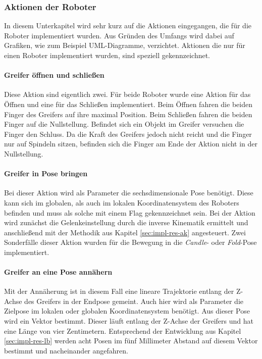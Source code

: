 \subsubsection{Aktionen der Roboter}

In diesem Unterkapitel wird sehr kurz auf die Aktionen eingegangen, die für die Roboter implementiert wurden. Aus Gründen des Umfangs wird dabei auf Grafiken, wie zum Beispiel UML-Diagramme, verzichtet. Aktionen die nur für einen Roboter implementiert wurden, sind speziell gekennzeichnet.

\paragraph{Greifer öffnen und schließen} Diese Aktion sind eigentlich zwei. Für beide Roboter wurde eine Aktion für das Öffnen und eine für das Schließen implementiert. Beim Öffnen fahren die beiden Finger des Greifers auf ihre maximal Position. Beim Schließen fahren die beiden Finger auf die Nullstellung. Befindet sich ein Objekt im Greifer versuchen die Finger den Schluss. Da die Kraft des Greifers jedoch nicht reicht und die Finger nur auf Spindeln sitzen, befinden sich die Finger am Ende der Aktion nicht in der Nullstellung.

\paragraph{Greifer in Pose bringen} Bei dieser Aktion wird als Parameter die sechsdimensionale Pose benötigt. Diese kann sich im globalen, als auch im lokalen Koordinatensystem des Roboters befinden und muss als solche mit einem Flag gekennzeichnet sein. Bei der Aktion wird zunächst die Gelenkeinstellung durch die inverse Kinematik ermittelt und anschließend mit der Methodik aus Kapitel \ref{sec:impl-res-ak} angesteuert. Zwei Sonderfälle dieser Aktion wurden für die Bewegung in die \textit{Candle}- oder \textit{Fold}-Pose implementiert.

\paragraph{Greifer an eine Pose annähern} Mit der Annäherung ist in diesem Fall eine lineare Trajektorie entlang der Z-Achse des Greifers in der Endpose gemeint. Auch hier wird als Parameter die Zielpose im lokalen oder globalen Koordinatensystem benötigt. Aus dieser Pose wird ein Vektor bestimmt. Dieser läuft entlang der Z-Achse der Greifers und hat eine Länge von vier Zentimetern. Entsprechend der Entwicklung aus Kapitel \ref{sec:impl-res-lb} werden acht Posen im fünf Millimeter Abstand auf diesem Vektor bestimmt und nacheinander angefahren.

